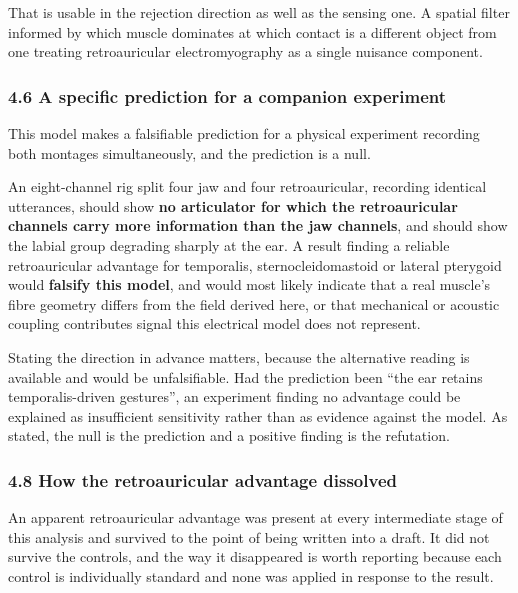 \documentclass[
  11pt,
]{article}
\newcounter{none} %
\begin{document}
That is usable in the rejection direction as well as the sensing one. A spatial
filter informed by which muscle dominates at which contact is a different object
from one treating retroauricular electromyography as a single nuisance
component.

\subsubsection{4.6 A specific prediction for a companion experiment}\label{a-specific-prediction-for-a-companion-experiment}

This model makes a falsifiable prediction for a physical experiment recording
both montages simultaneously, and the prediction is a null.

An eight-channel rig split four jaw and four retroauricular, recording identical
utterances, should show \textbf{no articulator for which the retroauricular channels
carry more information than the jaw channels}, and should show the labial group
degrading sharply at the ear. A result finding a reliable retroauricular
advantage for temporalis, sternocleidomastoid or lateral pterygoid would
\textbf{falsify this model}, and would most likely indicate that a real muscle's fibre
geometry differs from the field derived here, or that mechanical or acoustic
coupling contributes signal this electrical model does not represent.

Stating the direction in advance matters, because the alternative reading is
available and would be unfalsifiable. Had the prediction been ``the ear retains
temporalis-driven gestures'', an experiment finding no advantage could be
explained as insufficient sensitivity rather than as evidence against the model.
As stated, the null is the prediction and a positive finding is the refutation.

\subsubsection{4.8 How the retroauricular advantage dissolved}\label{how-the-retroauricular-advantage-dissolved}

An apparent retroauricular advantage was present at every intermediate stage of
this analysis and survived to the point of being written into a draft. It did not
survive the controls, and the way it disappeared is worth reporting because each
control is individually standard and none was applied in response to the result.
\end{document}
